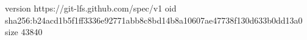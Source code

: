 version https://git-lfs.github.com/spec/v1
oid sha256:b24acd1b5f1ff3336e92771abb8c8bd14b8a10607ae47738f130d633b0dd13a0
size 43840
